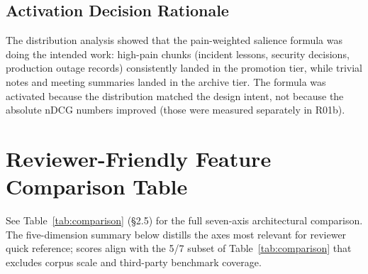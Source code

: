 \subsection{Activation Decision Rationale}

The distribution analysis showed that the pain-weighted salience formula was doing the
intended work: high-pain chunks (incident lessons, security decisions, production outage
records) consistently landed in the promotion tier, while trivial notes and meeting
summaries landed in the archive tier. The formula was activated because the distribution
matched the design intent, not because the absolute nDCG numbers improved (those were
measured separately in R01b).

\section{Reviewer-Friendly Feature Comparison Table}

See Table~\ref{tab:comparison} (\S2.5) for the full seven-axis architectural comparison.
The five-dimension summary below distills the axes most relevant for reviewer quick
reference; scores align with the 5/7 subset of Table~\ref{tab:comparison} that excludes
corpus scale and third-party benchmark coverage.

\begin{table}[h]
  \caption{Detailed architectural feature comparison (reviewer-friendly).
    Five axes shown; the full 7-axis comparison (including corpus scale \textgreater100K
    and 3rd-party benchmark) is in Table~\ref{tab:comparison} of \S2.5. nox-mem covers
    5/7 axes; $\times$ on corpus scale and 3rd-party benchmark.}
  \centering
  \small
\end{table}

